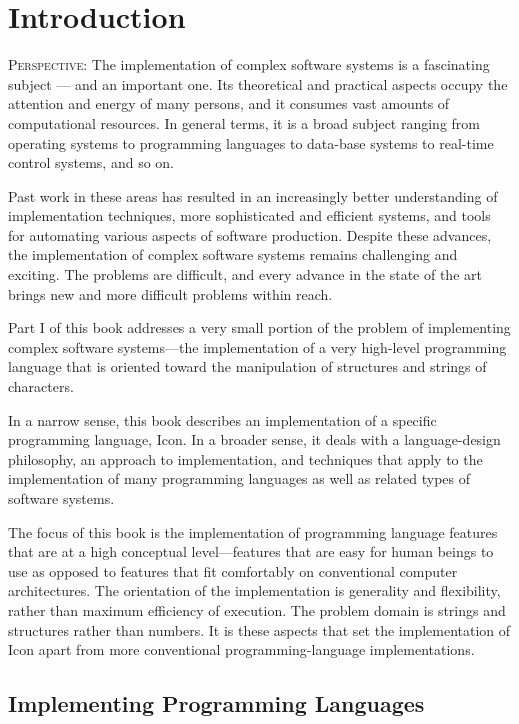 \chapter{Introduction}

\textsc{Perspective}: The implementation of complex software systems
is a fascinating subject --- and an important one. Its theoretical and
practical aspects occupy the attention and energy of many persons, and
it consumes vast amounts of computational resources. In general terms,
it is a broad subject ranging from operating systems to programming
languages to data-base systems to real-time control systems, and so
on.


Past work in these areas has resulted in an increasingly better
understanding of implementation techniques, more sophisticated and
efficient systems, and tools for automating various aspects of
software production. Despite these advances, the implementation of
complex software systems remains challenging and exciting. The
problems are difficult, and every advance in the state of the art
brings new and more difficult problems within reach.


Part I of this book addresses a very small portion of the problem of
implementing complex software systems{}---the implementation of a very
high-level programming language that is oriented toward the
manipulation of structures and strings of characters.


In a narrow sense, this book describes an implementation of a specific
programming language, Icon. In a broader sense, it deals with a
language-design philosophy, an approach to implementation, and
techniques that apply to the implementation of many programming
languages as well as related types of software systems.


The focus of this book is the implementation of programming language
features that are at a high conceptual level{}---features that are
easy for human beings to use as opposed to features that fit
comfortably on conventional computer architectures. The orientation of
the implementation is generality and flexibility, rather than maximum
efficiency of execution. The problem domain is strings and structures
rather than numbers. It is these aspects that set the implementation
of Icon apart from more conventional programming-language
implementations.

\section{Implementing Programming Languages}

